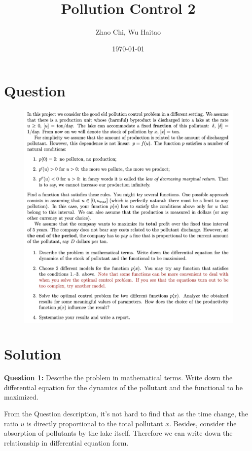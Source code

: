 \documentclass{article}
\title{Pollution Control 2}
\author{Zhao Chi, Wu Haitao}
\date{\today}
\newlength\imagewidth
\begin{document}
    \maketitle
\section*{Question}

\begin{figure}[ht]
    \centering
    \includegraphics[width=2.2\imagewidth]{Question.png}
\end{figure}


\section*{Solution}

{\bf Question 1:} Describe the problem in mathematical terms. Write down the differential equation for the dynamics of the pollutant and the functional to be maximized.

From the Question description, it's not hard to find that as the time change, the ratio $u$ is directly proportional to the total pollutant $x$. Besides, consider the absorption of pollutants by the lake itself. Therefore we can write down the relationship in differential equation form.
\end{document}
